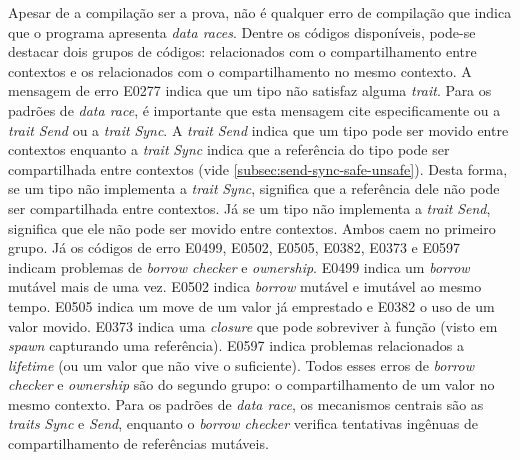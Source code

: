 Apesar de a compilação ser a prova, não é qualquer erro de compilação que indica que o programa apresenta \textit{data races}. Dentre os códigos disponíveis, pode-se destacar dois grupos de códigos: relacionados com o compartilhamento entre contextos e os relacionados com o compartilhamento no mesmo contexto. A mensagem de erro E0277 \citep{rust-error-index} indica que um tipo não satisfaz alguma \textit{trait}. Para os padrões de \textit{data race}, é importante que esta mensagem cite especificamente ou a \textit{trait} \textit{Send} ou a \textit{trait} \textit{Sync}. A \textit{trait} \textit{Send} indica que um tipo pode ser movido entre contextos enquanto a \textit{trait} \textit{Sync} indica que a referência do tipo pode ser compartilhada entre contextos (vide \ref{subsec:send-sync-safe-unsafe}). Desta forma, se um tipo não implementa a \textit{trait} \textit{Sync}, significa que a referência dele não pode ser compartilhada entre contextos. Já se um tipo não implementa a \textit{trait} \textit{Send}, significa que ele não pode ser movido entre contextos. Ambos caem no primeiro grupo. Já os códigos de erro E0499, E0502, E0505, E0382, E0373 e E0597 \citep{rust-error-index} indicam problemas de \textit{borrow checker} e \textit{ownership}. E0499 indica um \textit{borrow} mutável mais de uma vez. E0502 indica \textit{borrow} mutável e imutável ao mesmo tempo. E0505 indica um move de um valor já emprestado e E0382 o uso de um valor movido. E0373 indica uma \textit{closure} que pode sobreviver à função (visto em \textit{spawn} capturando uma referência). E0597 indica problemas relacionados a \textit{lifetime} (ou um valor que não vive o suficiente). Todos esses erros de \textit{borrow checker} e \textit{ownership} são do segundo grupo: o compartilhamento de um valor no mesmo contexto. Para os padrões de \textit{data race}, os mecanismos centrais são as \textit{traits} \textit{Sync} e \textit{Send}, enquanto o \textit{borrow checker} verifica tentativas ingênuas de compartilhamento de referências mutáveis.

